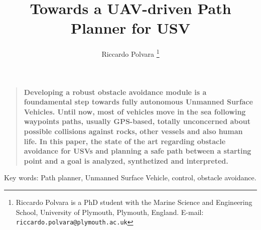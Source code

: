\documentclass[12pt]{article}
\newenvironment{sciabstract}{%
\begin{quote} \bf}
{\end{quote}}
\begin{document}
\baselineskip24pt

\title{Towards a UAV-driven Path Planner for USV}
%
%
%

\author{Riccardo Polvara%
\thanks{Riccardo Polvara is a PhD student with the Marine Science and Engineering School, University of Plymouth, Plymouth, England.
      E-mail: {\tt riccardo.polvara@plymouth.ac.uk}}}

\date{}


\maketitle



\begin{sciabstract}
Developing a robust obstacle avoidance module is a foundamental step towards fully autonomous Unmanned Surface Vehicles. Until now, most of vehicles move in the sea following way\-points paths, usually GPS-based, totally unconcerned about possible collisions against rocks, other vessels and also human life. In this paper, the state of the art regarding obstacle avoidance for USVs and planning a safe path between a starting point and a goal is analyzed, synthetized and interpreted.
\end{sciabstract}

Key words: Path planner, Unmanned Surface Vehicle, control, obstacle avoidance.
\end{document}
